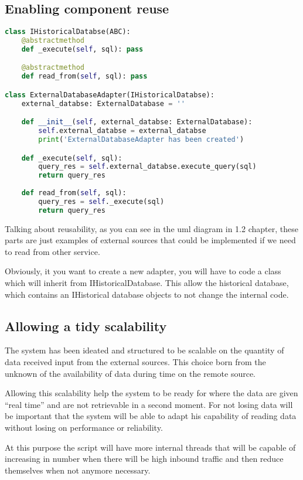 \subsection{Enabling component reuse}

\begin{lstlisting}[language=Python]
class IHistoricalDatabse(ABC):
    @abstractmethod
    def _execute(self, sql): pass

    @abstractmethod
    def read_from(self, sql): pass

class ExternalDatabaseAdapter(IHistoricalDatabse):
    external_databse: ExternalDatabase = ''

    def __init__(self, external_databse: ExternalDatabase):
        self.external_databse = external_databse
        print('ExternalDatabaseAdapter has been created')

    def _execute(self, sql):
        query_res = self.external_databse.execute_query(sql)
        return query_res
    
    def read_from(self, sql):
        query_res = self._execute(sql) 
        return query_res   
\end{lstlisting}

Talking about reusability, as you can see in the uml diagram in 1.2 chapter, these parts are just examples of external sources that could be implemented if we need to read from other service. 

Obviously, it you want to create a new adapter, you will have to code a class which will inherit from IHistoricalDatabase. This allow the historical database, which contains an IHistorical database objects to not change the internal code.

\subsection{Allowing a tidy scalability}

The system has been ideated and structured to be scalable on the quantity of data received input from the external sources.
This choice born from the unknown of the availability of data during time on the remote source.

Allowing this scalability help the system to be ready for where the data are given “real time” and are not retrievable in a second moment. For not losing data will be important that the system will be able to adapt his capability of reading data without losing on performance or reliability.

At this purpose the script will have more internal threads that will be capable of increasing in number when there will be high inbound traffic and then reduce themselves when not anymore necessary.

